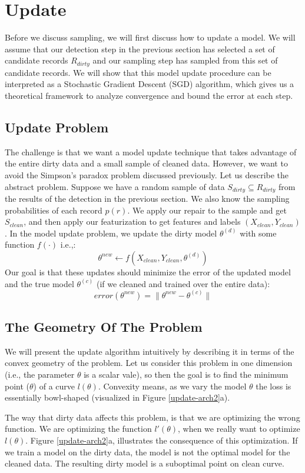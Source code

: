 \section{Update}\label{model-update}
Before we discuss sampling, we will first discuss how to update a model.
We will assume that our detection step in the previous section has selected 
a set of candidate records $R_{dirty}$ and our sampling step has sampled from this
set of candidate records.
We will show that this model update procedure can be interpreted as a Stochastic 
Gradient Descent (SGD) algorithm, which gives us a theoretical framework to analyze
convergence and bound the error at each step.

\subsection{Update Problem}
The challenge is that we want a model update technique that takes advantage of the entire dirty data and a small sample of cleaned data.
However, we want to avoid the Simpson's paradox problem discussed previously.
Let us describe the abstract problem.
Suppose we have a random sample of data $S_{dirty} \subseteq R_{dirty}$ from the results of the detection in the previous section.
We also know the sampling probabilities of each record $p(r)$.
We apply our repair to the sample and get $S_{clean}$, and then apply our featurization to get features and labels $(X_{clean},Y_{clean})$. 
In the model update problem, we update the dirty model $\theta^{(d)}$ with some function $f(\cdot)$ i.e.,:
\[
\theta^{new} \leftarrow f(X_{clean},Y_{clean},\theta^{(d)})
\]
Our goal is that these updates should minimize the error of the updated model and the true model $\theta^{(c)}$ (if we cleaned and trained over the entire data):
\[
error(\theta^{new}) = \| \theta^{new} - \theta^{(c)} \|
\]

\subsection{The Geometry Of The Problem}
We will present the update algorithm intuitively by describing it in terms of the convex geometry of the problem.
Let us consider this problem in one dimension (i.e., the parameter $\theta$ is a scalar vale), so then the goal is to find the minimum point ($\theta$) of a curve $l(\theta)$.
Convexity means, as we vary the model $\theta$ the loss is essentially bowl-shaped (visualized in Figure \ref{update-arch2}a).

The way that dirty data affects this problem, is that we are optimizing the wrong function.
We are optimizing the function $l'(\theta)$, when we really want to optimize $l(\theta)$.
Figure \ref{update-arch2}a, illustrates the consequence of this optimization.
If we train a model on the dirty data, the model is not the optimal model for the cleaned data.
The resulting dirty model is a suboptimal point on clean curve.


